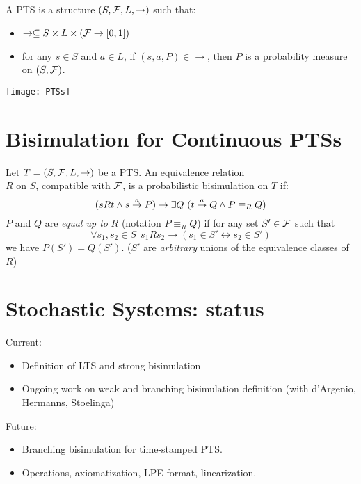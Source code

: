 \begin{slide}
A PTS is a structure $(S, {\cal F}, L, \to)$ such that:
\begin{itemize}
\item $\to\subseteq S\times L\times(\mathcal{F}\to[0,1])$
\item for any $s\in S$ and $a\in L$, if $(s,a,P)\in\to$, then $P$ is a probability measure on $(S,\mathcal{F})$.
\end{itemize}
\pause
\begin{center}
\texttt{[image: PTSs]}
\end{center}
\newslide\section*{Bisimulation for Continuous PTSs}
Let $T=(S,\mathcal{F}, L, \to)$ be a PTS. An equivalence relation\\
$R$ on $S$, compatible with $\mathcal{F}$, is a probabilistic bisimulation on $T$ if:
\[ (s R t\land s\stackrel{a}{\to} P) \to \exists Q~(t\stackrel{a}{\to} Q \land P \equiv_R Q) \]
\pause
$P$ and $Q$ are \emph{equal up to} $R$ (notation $P\equiv_R Q$) if
for any set $S'\in\mathcal{F}$ such that
\[\forall s_1,s_2\in S~~s_1 R s_2 \to (s_1\in S'\leftrightarrow s_2\in S')\]
we have $P(S')=Q(S')$. ($S'$ are \emph{arbitrary} unions of the equivalence classes of $R$)
\newslide\section*{Stochastic Systems: status}
Current:
\begin{itemize}
\item Definition of LTS and strong bisimulation
\item Ongoing work on weak and branching bisimulation definition (with d'Argenio, Hermanns, Stoelinga)
\end{itemize}
\pause
Future:
\begin{itemize}
\item Branching bisimulation for time-stamped PTS.
\item Operations, axiomatization, LPE format, linearization.
\end{itemize}

\end{slide}
